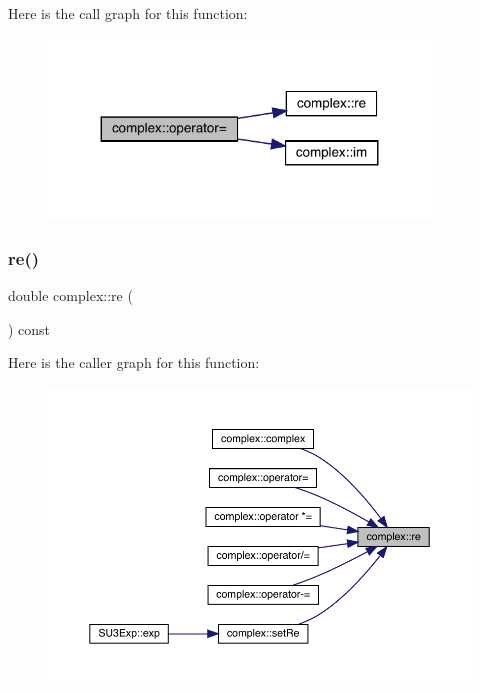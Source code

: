 Here is the call graph for this function\+:
\nopagebreak
\begin{figure}[H]
\begin{center}
\leavevmode
\includegraphics[width=287pt]{classcomplex_a83c122535af669e7f331d71de550e9ba_cgraph}
\end{center}
\end{figure}
\mbox{\label{classcomplex_a696019188accc543e7c8297595e297ec}} 
\subsubsection{\texorpdfstring{re()}{re()}}
{\footnotesize\ttfamily double complex\+::re (\begin{DoxyParamCaption}{ }\end{DoxyParamCaption}) const\hspace{0.3cm}{\ttfamily [inline]}}

Here is the caller graph for this function\+:
\nopagebreak
\begin{figure}[H]
\begin{center}
\leavevmode
\includegraphics[width=350pt]{classcomplex_a696019188accc543e7c8297595e297ec_icgraph}
\end{center}
\end{figure}
\mbox{\label{classcomplex_aa4c37b87b5b9beebddad476b3049394c}} 
